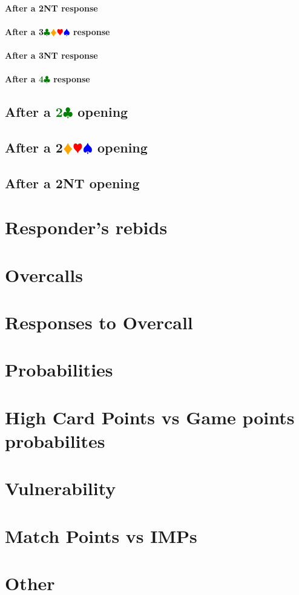 \documentclass{article}
\newcommand{\Hs}{\textcolor{Red}{$\varheart$}}
\newcommand{\Ss}{\textcolor{Blue}{$\spadesuit$}}
\newcommand{\Ds}{\textcolor{Orange}{$\vardiamond$}}
\newcommand{\Cs}{\textcolor{Green}{$\clubsuit$}}
\newcommand{\NTs}{\textbf{\footnotesize{NT}}}
\newcommand{\C}[1]{\textcolor{Green}{\textbf{#1}\Cs}}
\newcommand{\NT}[1]{\textbf{#1\NTs}}
\newcommand{\suits}[1]{\textbf{#1}\Cs\Ds\Hs\Ss}
\newcommand{\notclubs}[1]{\textbf{#1}\Ds\Hs\Ss}
\begin{document}
\paragraph{After a \NT{2} response}

\paragraph{After a \suits{3} response}

\paragraph{After a \NT{3} response}

\paragraph{After a \C{4} response} 

\subsection{After a \C{2} opening}

\subsection{After a \notclubs{2} opening}

\subsection{After a \NT{2} opening}

\section{Responder's rebids}


\section{Overcalls}
\section{Responses to Overcall}

\section{Probabilities}
\section{High Card Points vs Game points probabilites}
\section{Vulnerability}
\section{Match Points vs IMPs}
\section{Other}
\end{document}
